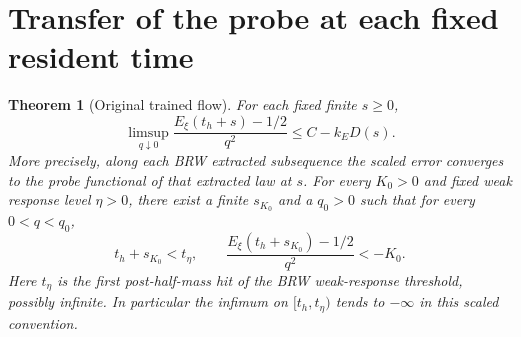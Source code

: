 \documentclass[11pt]{article}
\newtheorem{theorem}{Theorem}
\begin{document}
\section{Transfer of the probe at each fixed resident time}
\begin{theorem}[Original trained flow]\label{an04codv1:trained}
For each fixed finite $s\ge0$,
\[
 \limsup_{q\downarrow0}\frac{E_\xi(t_h+s)-1/2}{q^2}
       \le C-k_E D(s).
\]
More precisely, along each BRW extracted subsequence the scaled
error converges to the probe functional of that extracted law
at $s$. For every $K_0>0$ and fixed weak response level $\eta>0$,
there exist a finite $s_{K_0}$ and a $q_0>0$ such that for every
$0<q<q_0$,
\[
 t_h+s_{K_0}<t_\eta,\qquad
 \frac{E_\xi(t_h+s_{K_0})-1/2}{q^2}<-K_0 .
\]
Here $t_\eta$ is the first post-half-mass hit of the BRW weak-response
threshold, possibly infinite. In particular the infimum on
$[t_h,t_\eta)$ tends to $-\infty$ in this scaled convention.
\end{theorem}
\end{document}
